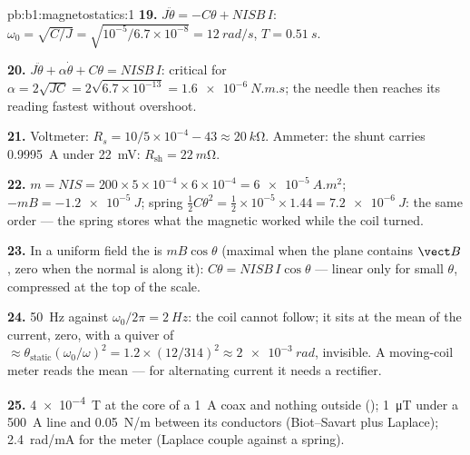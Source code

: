 \begin{solution}{pb:b1:magnetostatics:1}
\textbf{19.} $J\ddot\theta = -C\theta + NISB\,I$: $\omega_0 = \sqrt{C/J} = \sqrt{10^{-5}/6.7
\times 10^{-8}} = \qty{12}{rad/s}$, $T = \qty{0.51}{s}$.

\textbf{20.} $J\ddot\theta + \alpha\dot\theta + C\theta = NISB\,I$: critical for
$\alpha = 2\sqrt{JC} = 2\sqrt{6.7 \times 10^{-13}} = \qty{1.6e-6}{N.m.s}$; the needle
then reaches its reading fastest without overshoot.

\textbf{21.} Voltmeter: $R_s = 10/5 \times 10^{-4} - 43 \approx \qty{20}{k\ohm}$.
Ammeter: the shunt carries \qty{0.9995}{A} under \qty{22}{mV}: $R_{\text{sh}} =
\qty{22}{m\ohm}$.

\textbf{22.} $m = NIS = 200 \times 5 \times 10^{-4} \times 6 \times 10^{-4} = \qty{6e-5}{A.m^2}$;
$-mB = \qty{-1.2e-5}{J}$; spring $\tfrac12C\theta^2 = \tfrac12 \times 10^{-5} \times 1.44 =
\qty{7.2e-6}{J}$: the same order --- the spring stores what the magnetic
 worked while the coil turned.

\textbf{23.} In a uniform field the  is $mB\cos\theta$ (maximal when
the plane contains $\vect B$, zero when the normal is along it): $C\theta =
NISB\,I\cos\theta$ --- linear only for small $\theta$, compressed at the
top of the scale.

\textbf{24.} \qty{50}{Hz} against $\omega_0/2\pi = \qty{2}{Hz}$: the coil cannot
follow; it sits at the mean of the current, zero, with a quiver of
 $\approx \theta_{\text{static}}(\omega_0/\omega)^2 = 1.2 \times (12/314)^2 \approx
\qty{2e-3}{rad}$, invisible. A moving-coil meter reads the mean --- for
alternating current it needs a rectifier.

\textbf{25.} \qty{4e-4}{T} at the core of a \qty{1}{A} coax and nothing outside
(); \qty{1}{\micro T} under a \qty{500}{A} line and \qty{0.05}{N/m}
between its conductors (Biot--Savart plus Laplace); \qty{2.4}{rad/mA} for
the meter (Laplace couple against a spring).
\end{solution}
